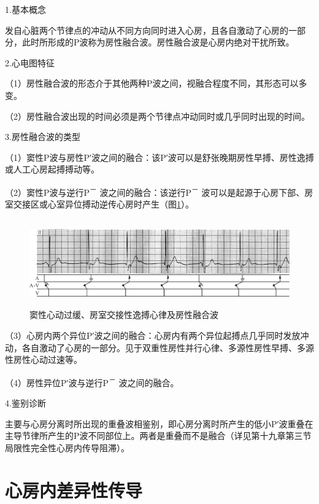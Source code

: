 1.基本概念

发自心脏两个节律点的冲动从不同方向同时进入心房，且各自激动了心房的一部分，此时所形成的P波称为房性融合波。房性融合波是心房内绝对干扰所致。

2.心电图特征

（1）房性融合波的形态介于其他两种P波之间，视融合程度不同，其形态可以多变。

（2）房性融合波出现的时间必须是两个节律点冲动同时或几乎同时出现的时间。

3.房性融合波的类型

（1）窦性P波与房性P′波之间的融合：该P′波可以是舒张晚期房性早搏、房性逸搏或人工心房起搏搏动等。

（2）窦性P波与逆行P\textsuperscript{－}
波之间的融合：该逆行P\textsuperscript{－}
波可以是起源于心房下部、房室交接区或心室异位搏动逆传心房时产生（图\ref{fig1-27}）。

\begin{figure}[!htbp]
 \centering
 \includegraphics[width=5.75in,height=1.47917in]{./images/Image00033.jpg}
 \captionsetup{justification=centering}
 \caption{窦性心动过缓、房室交接性逸搏心律及房性融合波}
 \label{fig1-27}
  \end{figure} 

（3）心房内两个异位P′波之间的融合：心房内有两个异位起搏点几乎同时发放冲动，各自激动了心房的一部分。见于双重性房性并行心律、多源性房性早搏、多源性房性心动过速等。

（4）房性异位P′波与逆行P\textsuperscript{－} 波之间的融合。

4.鉴别诊断

主要与心房分离时所出现的重叠波相鉴别，即心房分离时所产生的低小P′波重叠在主导节律所产生的P波不同部位上。两者是重叠而不是融合（详见第十九章第三节局限性完全性心房内传导阻滞）。

\protect\hypertarget{text00007.htmlux5cux23subid25}{}{}

\section{心房内差异性传导}

\protect\hypertarget{text00007.htmlux5cux23subid26}{}{}

